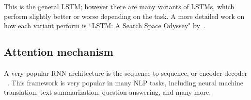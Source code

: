 
This is the general LSTM; however there are many variants of LSTMs, which perform slightly better or worse depending on the task. A more detailed work on how each variant perform is ``LSTM: A Search Space Odyssey" by~\citet{greff2017lstm}.


\subsection{Attention mechanism}
\label{sec:encoder_decoder}


\paragraph{}
A very popular RNN architecture is the sequence-to-sequence, or encoder-decoder ~\citep{cho-etal-2014-learning,sutskever2014sequence}. This framework is very popular in many NLP tasks, including neural machine translation, text summarization, question answering, and many more. 

